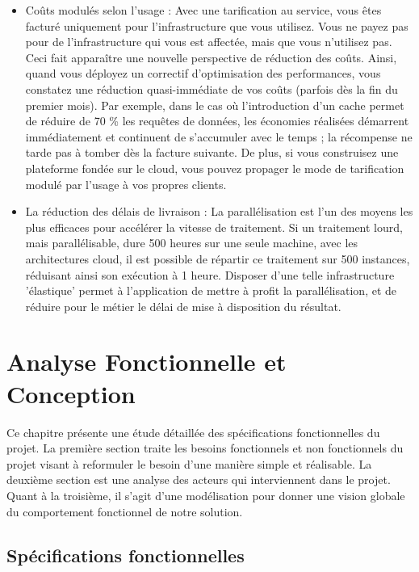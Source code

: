 \documentclass[a4paper, 12pt]{report}
\begin{document}
\begin{itemize}
\begin{itemize}
\item Coûts modulés selon l'usage : Avec une tarification au service, vous êtes facturé uniquement pour l'infrastructure que vous utilisez. Vous ne payez pas pour de l'infrastructure qui vous est affectée, mais que vous n'utilisez pas. Ceci fait apparaître une nouvelle perspective de réduction des coûts. Ainsi, quand vous déployez un correctif d'optimisation des performances, vous constatez une réduction quasi-immédiate de vos coûts (parfois dès la fin du premier mois). Par exemple, dans le cas où l'introduction d'un cache permet de réduire de 70 \% 
les requêtes de données, les économies réalisées démarrent immédiatement et continuent de s'accumuler avec le temps ; la récompense ne tarde pas à tomber dès la facture suivante. De plus, si vous construisez une plateforme fondée sur le cloud, vous pouvez propager le mode de tarification modulé par l'usage à vos propres clients. 
 
	\item La réduction des délais de livraison : La parallélisation est l'un des moyens les plus efficaces pour accélérer la vitesse de traitement. Si un traitement lourd, mais parallélisable, dure 500 heures sur une seule machine, avec les architectures cloud, il est possible de répartir ce traitement sur 500 instances, réduisant ainsi son exécution à 1 heure. Disposer d'une telle infrastructure 'élastique' permet à l'application de mettre à profit la parallélisation, et de réduire pour le métier le délai de mise à disposition du résultat. 
\end{itemize}
\chapter{Analyse Fonctionnelle et Conception}
Ce chapitre présente une étude détaillée des spécifications fonctionnelles du projet. La première section traite les besoins fonctionnels et non fonctionnels du projet visant à reformuler le besoin d'une manière simple et réalisable. La deuxième section est une analyse des acteurs qui interviennent dans le projet. Quant à la troisième, il s'agit d'une modélisation pour donner une vision globale du comportement fonctionnel de notre solution. 
\section{ Spécifications fonctionnelles }

\end{itemize}
\end{document}
